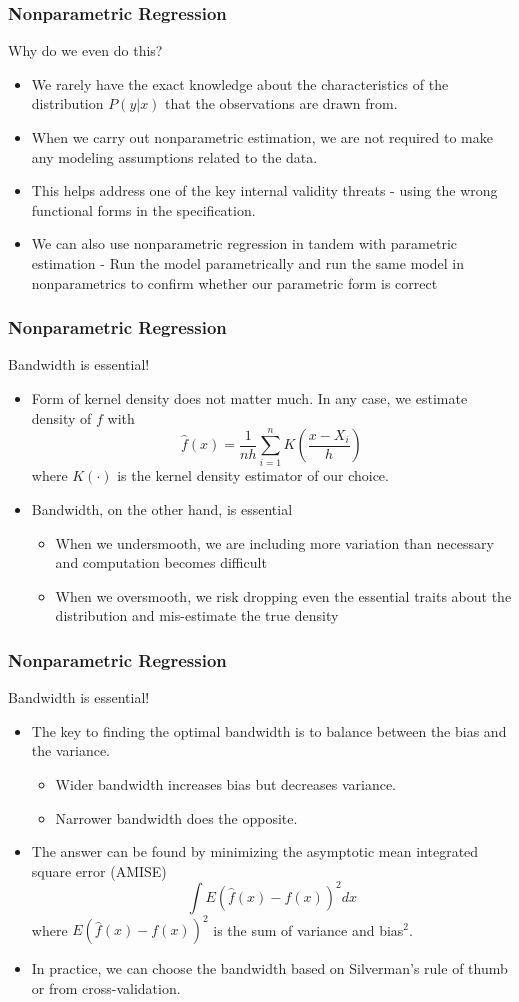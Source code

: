 \documentclass{beamer}
\begin{document}
\begin{frame}
\frametitle{Nonparametric Regression}
Why do we even do this?
\begin{itemize}
\item We rarely have the exact knowledge about the characteristics of the distribution $P(y|x)$ that the observations are drawn from. \item When we carry out nonparametric estimation, we are not required to make any modeling assumptions related to the data.
\item This helps address one of the key internal validity threats - using the wrong functional forms in the specification. 
\item We can also use nonparametric regression in tandem with parametric estimation - Run the model parametrically and run the same model in nonparametrics to confirm whether our parametric form is correct
\end{itemize}
\end{frame}

\begin{frame}
\frametitle{Nonparametric Regression}
Bandwidth is essential!
\begin{itemize}
\item Form of kernel density does not matter much. In any case, we estimate density of $f$ with
\[
\hat{f}(x)=\frac{1}{nh}\sum_{i=1}^n K\left(\frac{x-X_i}{h}\right)
\]
where $K(\cdot)$ is the kernel density estimator of our choice. 
\item Bandwidth, on the other hand, is essential
\begin{itemize}
\item When we undersmooth, we are including more variation than necessary and computation becomes difficult
\item When we oversmooth, we risk dropping even the essential traits about the distribution and mis-estimate the true density
\end{itemize}
\end{itemize}
\end{frame}

\begin{frame}
\frametitle{Nonparametric Regression}
Bandwidth is essential!
\begin{itemize}
\item The key to finding the optimal bandwidth is to balance between the bias and the variance.
\begin{itemize}
\item  Wider bandwidth increases bias but decreases variance. 
\item Narrower bandwidth does the opposite.
\end{itemize}
\item The answer can be found by minimizing the asymptotic mean integrated square error (AMISE)
\[
\int E(\hat{f}(x)-f(x))^2dx
\]
where $E(\hat{f}(x)-f(x))^2$ is the sum of variance and bias$^2$.
\item  In practice, we can choose the bandwidth based on Silverman's rule of thumb or from cross-validation. 
\end{itemize}
\end{frame}
\end{document}
